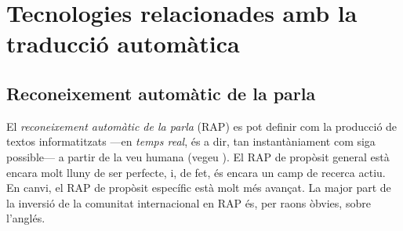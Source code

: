\section{Tecnologies relacionades amb la traducció automàtica}

\subsection{Reconeixement automàtic de la parla}
\label{s3:recparla}

El \emph{reconeixement automàtic de la parla} (RAP) es pot definir
com la producció de textos informatitzats ---en \emph{temps real}, és
a dir, tan instantàniament com siga possible--- a partir de la veu
humana (vegeu \citet{samuelson-brown96b}). El RAP de propòsit general
està encara molt lluny de ser perfecte, i, de fet, és encara un camp
de recerca actiu.  En canvi, el RAP de propòsit específic està molt
més avançat. La major part de la inversió de la comunitat
internacional en RAP és, per raons òbvies, sobre l'anglés.

